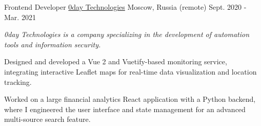 \begin{cventries}
  \cventry
    {Frontend Developer} %
    {\href{https://0day.llc/}{0day Technologies}}
    {Moscow, Russia (remote)} %
    {Sept. 2020 - Mar. 2021} %
    {
      \begin{cvitems} %
      \vspace{8pt}
      \item[] {\small\textit{0day Technologies is a company specializing in the development of automation tools and information security.}}
      \vspace{8pt}
        \item {Designed and developed a Vue 2 and Vuetify-based monitoring service, integrating interactive Leaflet maps for real-time data visualization and location tracking.}
        \item {Worked on a large financial analytics React application with a Python backend, where I engineered the user interface and state management for an advanced multi-source search feature.}
      \end{cvitems}
    }
    {\vspace{24pt}}

\end{cventries}
